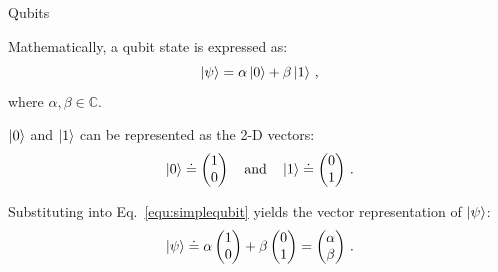 \documentclass[10pt]{beamer}
\begin{document}
{
\begin{frame}[fragile]{Qubits}

Mathematically, a qubit state is expressed as:
\begin{equation}
\label{equ:simplequbit}
\ket{\psi} = \alpha \ket{0} + \beta \ket{1}\, ,
\end{equation}
where $\alpha, \beta \in \mathbb{C}$.

$\ket{0}$ and $\ket{1}$ can be represented as the 2-D vectors:
\begin{equation}
\ket{0} \doteq  \begin{pmatrix}1\\0\end{pmatrix} \quad \mathrm{and} \quad \ket{1} \doteq \begin{pmatrix}0\\1\end{pmatrix}\, .
\end{equation}

Substituting into Eq.~\ref{equ:simplequbit} yields the vector representation of $\ket{\psi}$:
\begin{equation}
\ket{\psi} \doteq \alpha \begin{pmatrix} 1\\0 \end{pmatrix} + \beta \begin{pmatrix}0\\1 \end{pmatrix} = \begin{pmatrix}\alpha\\\beta\end{pmatrix}\, .
\end{equation}

\end{frame}
}
\end{document}
